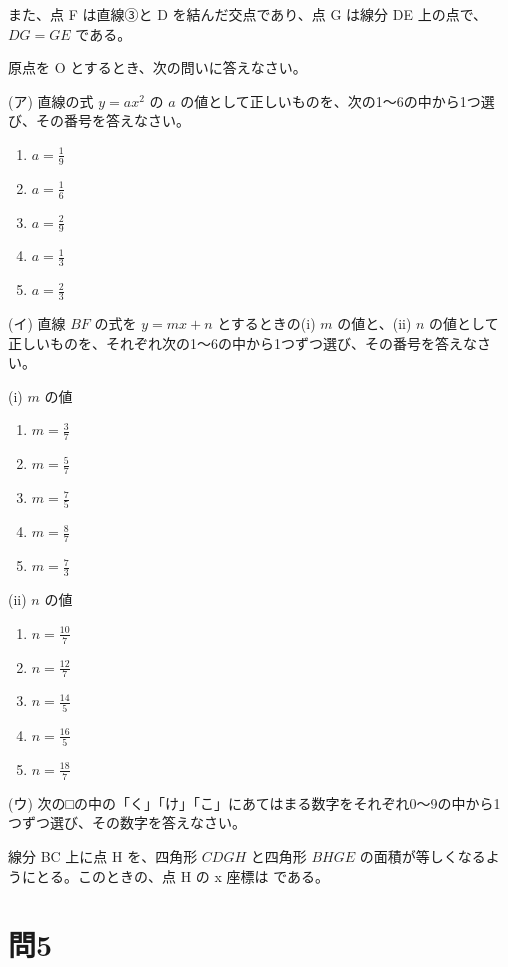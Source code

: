 \documentclass{ltjsarticle}
\begin{document}
また、点 F は直線③と D を結んだ交点であり、点 G は線分 DE 上の点で、$DG = GE$ である。

原点を O とするとき、次の問いに答えなさい。

(ア) 直線の式 $y = ax^2$ の $a$ の値として正しいものを、次の1～6の中から1つ選び、その番号を答えなさい。

\begin{enumerate}
    \item $a = \frac{1}{9}$
    \item $a = \frac{1}{6}$
    \item $a = \frac{2}{9}$
    \item $a = \frac{1}{3}$
    \item $a = \frac{2}{3}$
\end{enumerate}

(イ) 直線 $BF$ の式を $y = mx + n$ とするときの(i) $m$ の値と、(ii) $n$ の値として正しいものを、それぞれ次の1～6の中から1つずつ選び、その番号を答えなさい。

(i) $m$ の値

\begin{enumerate}
    \item $m = \frac{3}{7}$
    \item $m = \frac{5}{7}$
    \item $m = \frac{7}{5}$
    \item $m = \frac{8}{7}$
    \item $m = \frac{7}{3}$
\end{enumerate}

(ii) $n$ の値

\begin{enumerate}
    \item $n = \frac{10}{7}$
    \item $n = \frac{12}{7}$
    \item $n = \frac{14}{5}$
    \item $n = \frac{16}{5}$
    \item $n = \frac{18}{7}$
\end{enumerate}

(ウ) 次の□の中の「く」「け」「こ」にあてはまる数字をそれぞれ0～9の中から1つずつ選び、その数字を答えなさい。

線分 BC 上に点 H を、四角形 $CDGH$ と四角形 $BHGE$ の面積が等しくなるようにとる。このときの、点 H の x 座標は  である。

\section*{問5}
\end{document}
